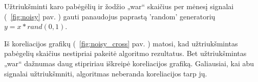 Užtriukšminti karo pabėgėlių ir žodžio „war“ skaičius per mėnesį signalai (~\ref{fig:noisy} pav. ) gauti panaudojus paprastą 'random' generatorių \(y = x * rand(0, 1)\).

Iš koreliacijos grafikų (~\ref{fig:noisy_cross} pav. ) matosi, kad užtriukšmintas pabėgelių skaičius nestipriai pakeitė algoritmo rezultatus.
Bet užtriukšmintas „war“ dažnumas daug stipririau iškreipė koreliacijos grafiką.
Galiausiai, kai abu signalai užtriukšmniti, algoritmas neberanda koreliacijos tarp jų.
